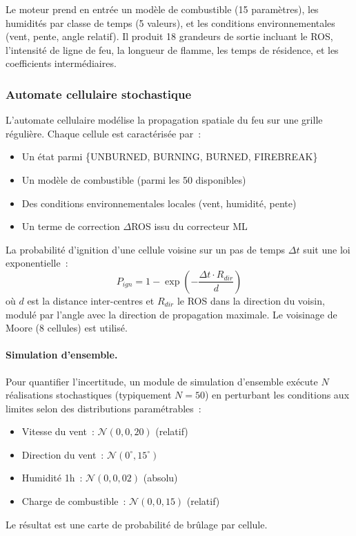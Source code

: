 Le moteur prend en entrée un modèle de combustible (15 paramètres), les humidités par classe de temps (5 valeurs), et les conditions environnementales (vent, pente, angle relatif). Il produit 18 grandeurs de sortie incluant le ROS, l'intensité de ligne de feu, la longueur de flamme, les temps de résidence, et les coefficients intermédiaires.

\subsubsection{Automate cellulaire stochastique}

L'automate cellulaire modélise la propagation spatiale du feu sur une grille régulière. Chaque cellule est caractérisée par~:

\begin{itemize}[nosep]
    \item Un état parmi \{UNBURNED, BURNING, BURNED, FIREBREAK\}
    \item Un modèle de combustible (parmi les 50 disponibles)
    \item Des conditions environnementales locales (vent, humidité, pente)
    \item Un terme de correction $\Delta$ROS issu du correcteur ML
\end{itemize}

La probabilité d'ignition d'une cellule voisine sur un pas de temps $\Delta t$ suit une loi exponentielle~:
\begin{equation}
P_{ign} = 1 - \exp\left(-\frac{\Delta t \cdot R_{dir}}{d}\right)
\end{equation}
où $d$ est la distance inter-centres et $R_{dir}$ le ROS dans la direction du voisin, modulé par l'angle avec la direction de propagation maximale. Le voisinage de Moore (8 cellules) est utilisé.

\paragraph{Simulation d'ensemble.} Pour quantifier l'incertitude, un module de simulation d'ensemble exécute $N$ réalisations stochastiques (typiquement $N=50$) en perturbant les conditions aux limites selon des distributions paramétrables~:
\begin{itemize}[nosep]
    \item Vitesse du vent~: $\mathcal{N}(0, 0{,}20)$ (relatif)
    \item Direction du vent~: $\mathcal{N}(0^\circ, 15^\circ)$
    \item Humidité 1h~: $\mathcal{N}(0, 0{,}02)$ (absolu)
    \item Charge de combustible~: $\mathcal{N}(0, 0{,}15)$ (relatif)
\end{itemize}
Le résultat est une carte de probabilité de brûlage par cellule.

